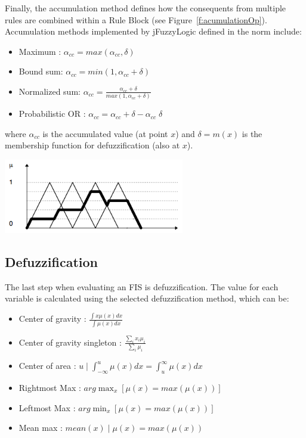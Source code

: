 \documentclass[11pt,twoside]{article}
\begin{document}
\begin{multicols}{2}
Finally, the accumulation method defines how the consequents from multiple rules are combined within a Rule Block (see Figure~\ref{f:acumulationOp}).
Accumulation methods implemented by jFuzzyLogic defined in the norm include: 

\begin{itemize}
	\item Maximum : $\alpha_{cc} = max(\alpha_{cc}, \delta)$
	\item Bound sum: $\alpha_{cc} = min(1, \alpha_{cc} + \delta)$
	\item Normalized sum: $\alpha_{cc} = \frac{\alpha_{cc} + \delta}{max(1, \alpha_{cc} + \delta)}$
	\item Probabilistic OR : $\alpha_{cc} =  \alpha_{cc} + \delta -  \alpha_{cc} \; \delta$
\end{itemize}

where $\alpha_{cc}$ is the accumulated value (at point $x$) and $\delta = m(x)$ is the membership function for defuzzification (also at $x$).

\vspace*{5pt}
\centerline{\includegraphics[width=3.1in]{./figs/accumulation.png}}
\vspace*{3pt}
\label{f:acumulationOp}
\vspace*{5pt}


\subsection{Defuzzification\label{sec:defuzz}}


The last step when evaluating an FIS is defuzzification. The value for each variable is calculated using the selected defuzzification method, which can be:

\begin{itemize}
	\item Center of gravity : $\frac{\int{x \mu(x) dx}}{\int{\mu(x) dx}}$
	\item Center of gravity singleton : $\frac{\sum_{i}{x_i \mu_i}}{\sum_{i}{\mu_i}}$
	\item Center of area : $u \; | \; \int_{-\infty}^{u}{\mu(x) dx} = \int_{u}^{\infty}{\mu(x) dx}$
	\item Rightmost Max : $arg\max_{x}{[ \mu(x) = max(\mu(x)) ] }$
	\item Leftmost Max : $arg\min_{x}{[ \mu(x) = max(\mu(x)) ] }$
	\item Mean max : $mean(x) \; | \; \mu(x) = max(\mu(x)) $
\end{itemize}


\end{multicols}
\end{document}
